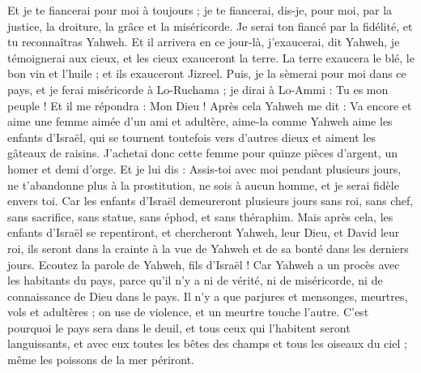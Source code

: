 \begin{multicols}{2}
Et je te fiancerai pour moi à toujours ; je te fiancerai, dis-je, pour moi, par la justice, la droiture, la grâce et la miséricorde.
Je serai ton fiancé par la fidélité, et tu reconnaîtras Yahweh.
Et il arrivera en ce jour-là, j'exaucerai, dit Yahweh, je témoignerai aux cieux, et les cieux exauceront la terre.
La terre exaucera le blé, le bon vin et l'huile ; et ils exauceront Jizreel.
Puis, je la sèmerai pour moi dans ce pays, et je ferai miséricorde à Lo-Ruchama ; je dirai à Lo-Ammi : Tu es mon peuple ! Et il me répondra : Mon Dieu !
\VerseOne{}Après cela Yahweh me dit : Va encore et aime une femme aimée d'un ami et adultère, aime-la comme Yahweh aime les enfants d'Israël, qui se tournent toutefois vers d'autres dieux et aiment les gâteaux de raisins.
J'achetai donc cette femme pour quinze pièces d'argent, un homer et demi d'orge.
Et je lui dis : Assis-toi avec moi pendant plusieurs jours, ne t'abandonne plus à la prostitution, ne sois à aucun homme, et je serai fidèle envers toi.
Car les enfants d'Israël demeureront plusieurs jours sans roi, sans chef, sans sacrifice, sans statue, sans éphod, et sans théraphim.
Mais après cela, les enfants d'Israël se repentiront, et chercheront Yahweh, leur Dieu, et David leur roi, ils seront dans la crainte à la vue de Yahweh et de sa bonté dans les derniers jours.
\VerseOne{}Ecoutez la parole de Yahweh, fils d'Israël ! Car Yahweh a un procès avec les habitants du pays, parce qu'il n'y a ni de vérité, ni de miséricorde, ni de connaissance de Dieu dans le pays.
Il n'y a que parjures et mensonges, meurtres, vols et adultères ; on use de violence, et un meurtre touche l'autre.
C'est pourquoi le pays sera dans le deuil, et tous ceux qui l'habitent seront languissants, et avec eux toutes les bêtes des champs et tous les oiseaux du ciel ; même les poissons de la mer périront.

\end{multicols}
